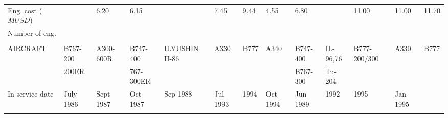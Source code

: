 \documentclass[12pt,a4paper]{report}
\begin{document}
\begin{landscape}
\begin{center}
\begin{longtable}{|p{1.5cm}|p{1.3cm}|p{1.1cm}|p{1.1cm}|p{1.1cm}|p{1.1cm}|p{1.1cm}|p{1.1cm}|p{1.1cm}|p{1.1cm}|p{1.1cm}|p{1.1cm}|p{1.1cm}|}
	&		&		&		&		&		&		&		&		&		&		&		&		\\ \hline
Eng. cost ($M USD$)	&		&	6.20	&	6.15	&		&	7.45	&	9.44	&	4.55	&	6.80	&		&	11.00	&	11.00	&	11.70	\\ \hline
Number of eng.	&		&		&		&		&		&		&		&		&		&		&		&		\\ \hline
	&		&		&		&		&		&		&		&		&		&		&		&		\\ \hline
AIRCRAFT	&	B767-200	&	A300-600R	&	B747-400	&	ILYUSHIN II-86 	&	A330	&	B777	&	A340	&	B747-400	&	 IL-96,76	&	B777-200/300	&	A330	&	B777	\\ \hline
	&	200ER	&		&	767-300ER	&		&		&		&		&	B767-300	&	Tu-204	&		&		&		\\ \hline
In service date	&	July 1986	&	Sept 1987	&	Oct 1987	&	Sep 1988	&	Jul 1993	&	1994	&	Oct 1994	&	Jun 1989	&	1992	&	1995	&	Jan 1995	&		\\ \hline
\hline
\label{nosegearpars} 
\end{longtable}
\end{center}
\end{landscape}

\cleardoublepage
\printbibliography[heading=bibintoc,title=参考文献]
\end{document}
